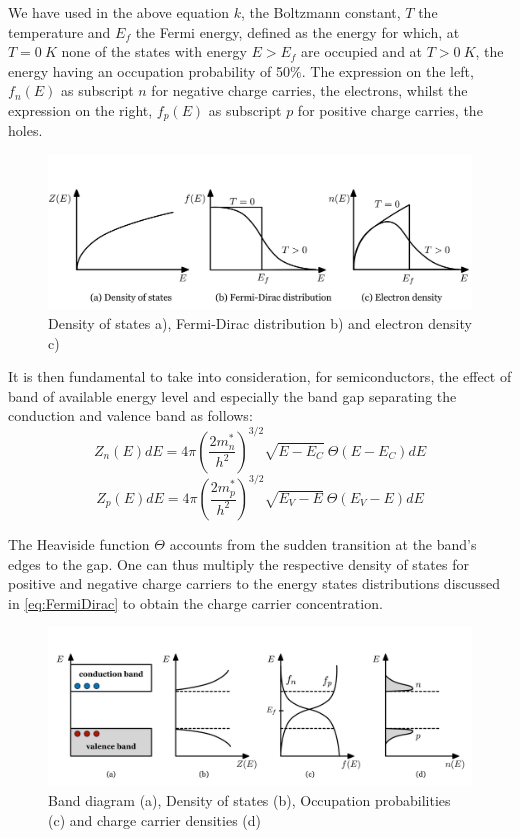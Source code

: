 		We have used in the above equation $k$, the Boltzmann constant, $T$ the temperature and $E_f$ the Fermi energy, defined as the energy for which, at $T=\SI{0}{K}$ none of the states with energy $E > E_f $ are occupied and at $T > \SI{0}{K}$, the energy having an occupation probability of 50$\%$. The expression on the left, $f_n(E)$ as subscript $n$ for negative charge carries, the electrons, whilst the expression on the right, $f_p(E)$ as subscript $p$ for positive charge carries, the holes. 
		\begin{figure}[h]
		\centering
		\includegraphics[width=0.9\linewidth]{files/density-fermidirac}
		\caption{Density of states a), Fermi-Dirac distribution b) and electron density c)}
		\end{figure}

		It is then fundamental to take into consideration, for semiconductors, the effect of band of available energy level and especially the band gap separating the conduction and valence band as follows: 
		\begin{equation}
			Z_n(E)dE = 4 \pi {\left(\frac{2m_n^*}{h^2}\right)}^{{3/2}} \sqrt{E-E_{C}}\ \Theta(E-E_C)dE
		\end{equation}
		\begin{equation}
			Z_p(E)dE = 4 \pi {\left(\frac{2m_p^*}{h^2}\right)}^{{3/2}} \sqrt{E_V-E}\ \Theta(E_V-E)dE
		\end{equation}

		The Heaviside function $\Theta$ accounts from the sudden transition at the band's edges to the gap. One can thus multiply the respective density of states for positive and negative charge carriers to the energy states distributions discussed in \eqref{eq:FermiDirac} to obtain the charge carrier concentration. 

		\begin{figure}[h]
			\centering
			\includegraphics[width=0.95\linewidth]{files/band_diagram}
			\caption{Band diagram (a), Density of states (b), Occupation probabilities (c) and charge carrier densities (d)}
		\end{figure}

